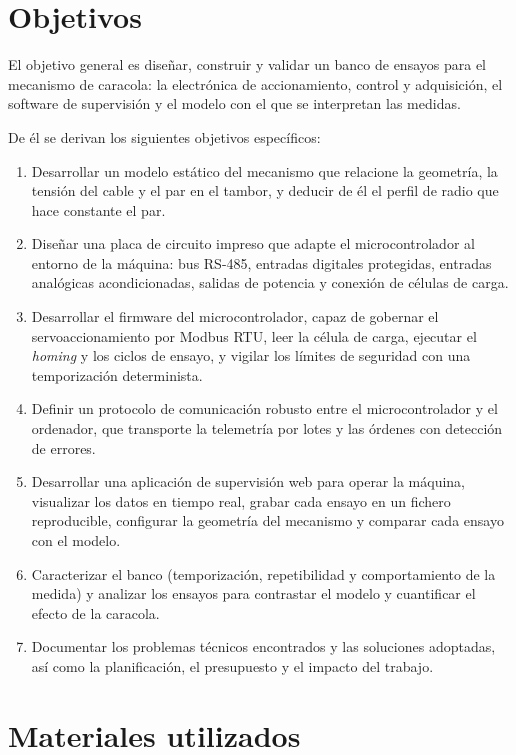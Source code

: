 \section{Objetivos}

El objetivo general es diseñar, construir y validar un banco de ensayos para el mecanismo de
caracola: la electrónica de accionamiento, control y adquisición, el software de supervisión y el
modelo con el que se interpretan las medidas.

De él se derivan los siguientes objetivos específicos:

\begin{enumerate}[label=\textbf{O\arabic*.}]
  \item Desarrollar un modelo estático del mecanismo que relacione la geometría, la tensión del
        cable y el par en el tambor, y deducir de él el perfil de radio que hace constante el par.
  \item Diseñar una placa de circuito impreso que adapte el microcontrolador al entorno de la
        máquina: bus RS-485, entradas digitales protegidas, entradas analógicas acondicionadas,
        salidas de potencia y conexión de células de carga.
  \item Desarrollar el firmware del microcontrolador, capaz de gobernar el servoaccionamiento por
        Modbus RTU, leer la célula de carga, ejecutar el \emph{homing} y los ciclos de ensayo, y
        vigilar los límites de seguridad con una temporización determinista.
  \item Definir un protocolo de comunicación robusto entre el microcontrolador y el ordenador, que
        transporte la telemetría por lotes y las órdenes con detección de errores.
  \item Desarrollar una aplicación de supervisión web para operar la máquina, visualizar los datos
        en tiempo real, grabar cada ensayo en un fichero reproducible, configurar la geometría del
        mecanismo y comparar cada ensayo con el modelo.
  \item Caracterizar el banco (temporización, repetibilidad y comportamiento de la medida) y
        analizar los ensayos para contrastar el modelo y cuantificar el efecto de la caracola.
  \item Documentar los problemas técnicos encontrados y las soluciones adoptadas, así como la
        planificación, el presupuesto y el impacto del trabajo.
\end{enumerate}

\section{Materiales utilizados}


